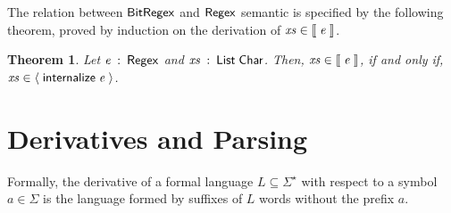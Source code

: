 \documentclass[sigconf]{acmart}
\newtheorem{Theorem}{Theorem}
\theoremstyle{definition}
\newcommand{\D}[1]{\blue{\mathsf{#1}}}
\newcommand{\F}[1]{\green{\mathsf{#1}}}
\newcommand{\V}[1]{\purple{\mathit{#1}}}
\begin{document}
The relation between \ensuremath{\D{BitRegex}} and \ensuremath{\D{Regex}} semantic is specified by
the following theorem, proved by induction on the derivation of \ensuremath{\V{xs}\;\D{\in\llbracket}\;\V{e}\;\D{\rrbracket}}.
\begin{Theorem}
Let \ensuremath{\V{e}\;\mathbin{:}\;\D{Regex}} and \ensuremath{\V{xs}\;\mathbin{:}\;\D{List}\;\D{Char}}. Then, \ensuremath{\V{xs}\;\D{\in\llbracket}\;\V{e}\;\D{\rrbracket}}, if and only if,
\ensuremath{\V{xs}\;\D{\in\langle}\;\F{internalize}\;\V{e}\;\D{\rangle}}.
\end{Theorem}

\section{Derivatives and Parsing}\label{sec:deriv}

Formally, the derivative of a formal language $L\subseteq
\Sigma^\star$ with respect to a symbol $a\in\Sigma$ is the language
formed by suffixes of $L$ words without the prefix $a$.
\end{document}
